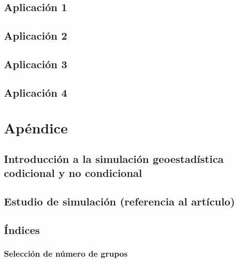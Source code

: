 \documentclass[
]{book}
\begin{document}
\hypertarget{aplicaciuxf3n-1}{%
\section{Aplicación 1}\label{aplicaciuxf3n-1}}

\hypertarget{aplicaciuxf3n-2}{%
\section{Aplicación 2}\label{aplicaciuxf3n-2}}

\hypertarget{aplicaciuxf3n-3}{%
\section{Aplicación 3}\label{aplicaciuxf3n-3}}

\hypertarget{aplicaciuxf3n-4}{%
\section{Aplicación 4}\label{aplicaciuxf3n-4}}

\hypertarget{apuxe9ndice}{%
\chapter{Apéndice}\label{apuxe9ndice}}

\hypertarget{introducciuxf3n-a-la-simulaciuxf3n-geoestaduxedstica-codicional-y-no-condicional}{%
\section{Introducción a la simulación geoestadística codicional y no condicional}\label{introducciuxf3n-a-la-simulaciuxf3n-geoestaduxedstica-codicional-y-no-condicional}}

\hypertarget{estudio-de-simulaciuxf3n-referencia-al-artuxedculo}{%
\section{Estudio de simulación (referencia al artículo)}\label{estudio-de-simulaciuxf3n-referencia-al-artuxedculo}}

\hypertarget{uxedndices}{%
\section{Índices}\label{uxedndices}}

\hypertarget{selecciuxf3n-de-nuxfamero-de-grupos}{%
\subsection{Selección de número de grupos}\label{selecciuxf3n-de-nuxfamero-de-grupos}}
\end{document}
